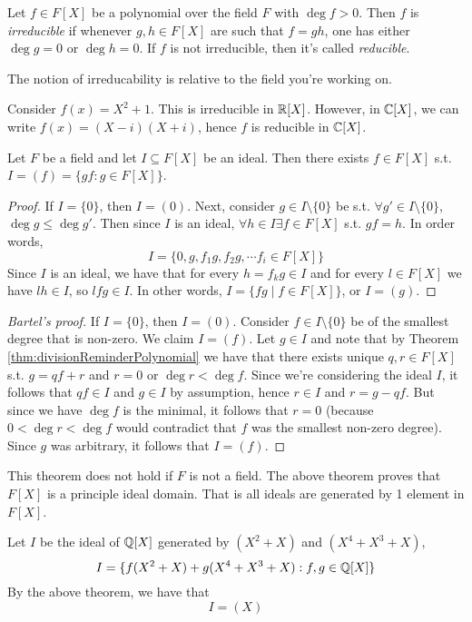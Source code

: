 \begin{definition}
  Let $f\in F[X]$ be a polynomial over the field $F$ with $\deg f>0$. Then $f$ is
  \emph{irreducible} if whenever $g,h\in F[X]$ are such that $f=gh$, one has either $\deg
  g=0$ or $\deg h=0$. If $f$ is not irreducible, then it's called \emph{reducible}.
\end{definition}
\begin{remark}
  The notion of irreducability is relative to the field you're working on.
\end{remark}
\begin{example}
  Consider $f(x)=X^2+1$. This is irreducible in $\mathbb R[X]$. However, in $\mathbb C[X]$, we can
  write $f(x)=(X-i)(X+i)$, hence $f$ is reducible in $\mathbb C[X]$.
\end{example}

\begin{theorem}
  Let $F$ be a field and let $I\subseteq F[X]$ be an ideal. Then there exists $f\in
  F[X]$ s.t. $I=(f)=\{gf : g\in F[X]\}$.
  \label{thm:idealPrinciplas}
\end{theorem}
\begin{proof}
  If $I=\{0\}$, then $I=(0)$. Next, consider $g\in I\setminus\{0\}$ be s.t. $\forall g'\in
  I\setminus\{0\}$, $\deg g \leq \deg g'$. Then since $I$ is an ideal,  $\forall h\in
  I\exists f\in F[X]$ s.t.  $gf=h$. In order words, 
  \[I= \{ 0, g, f_1g, f_2g, \cdots f_i\in F[X] \}\]
  Since $I$ is an ideal, we have that for every $h=f_k g \in I$ and for every $l\in F[X]$
  we have $lh\in I$, so $lfg \in I$. In other words, $I=\{fg \mid f\in F[X]\}$, or
  $I=(g)$.
\end{proof}
\begin{proof}[Bartel's proof]
  If $I=\{0\}$, then $I=(0)$. Consider $f\in I\setminus \{0\}$ be of the smallest degree
  that is non-zero. We claim $I=(f)$. Let $g\in I$ and note that by Theorem
  \ref{thm:divisionReminderPolynomial} we have that there exists unique $q,r\in F[X]$ s.t.
  $g=qf+r$ and $r=0$ or $\deg r < \deg f$. Since we're considering the ideal $I$, it
  follows that $qf\in I$ and $g\in I$ by assumption, hence $r\in I$ and $r=g-qf$. But since
  we have $\deg f$ is the minimal, it follows that $r=0$ (because $0<\deg r<\deg f$ would
  contradict that $f$ was the smallest non-zero degree). Since $g$ was arbitrary, it
  follows that $I=(f)$.
\end{proof}
\begin{remark}
  This theorem does not hold if $F$ is not a field. The above theorem proves that $F[X]$ is a principle ideal domain. That is all ideals are generated by 1 element in $F[X]$.
\end{remark}

\begin{example}
  Let $I$ be the ideal of $\mathbb Q[X]$ generated by $(X^2+X)$ and $(X^4+X^3+X)$, 
  \[I=\{f(X^2+X) + g(X^4+X^3+X) : f,g\in \mathbb Q[X]\}\]
  By the above theorem, we have that 
  \[I=(X)\]
\end{example}
